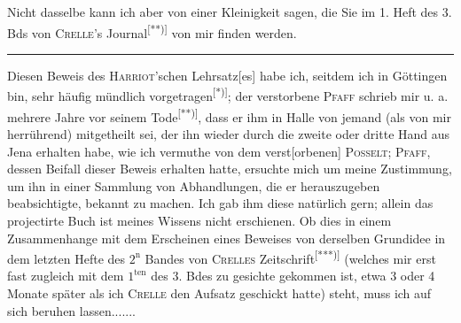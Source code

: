 \par\indent Nicht dasselbe kann ich aber von einer Kleinigkeit sagen, die Sie im 1. Heft des 3. Bds von \textsc{Crelle}’s Journal\textsuperscript{[**)]} von mir finden werden.
\par\vfill\noindent\rule{.25\linewidth}{.4pt}\par\smallskip
\begingroup\footnotesize
{}\par
{}\par\endgroup
\clearpage
{}
\noindent Diesen Beweis des \textsc{Harriot}’schen Lehrsatz[es] habe ich, seitdem ich in Göttingen bin, sehr häufig mündlich vorgetragen\textsuperscript{[*)]}; der verstorbene \textsc{Pfaff} schrieb mir u. a. mehrere Jahre vor seinem Tode\textsuperscript{[**)]}, dass er ihm in Halle von jemand (als von mir herrührend) mitgetheilt sei, der ihn wieder durch die zweite oder dritte Hand aus Jena erhalten habe, wie ich vermuthe von dem verst[orbenen] \textsc{Posselt}; \textsc{Pfaff}, dessen Beifall dieser Beweis erhalten hatte, ersuchte mich um meine Zustimmung, um ihn in einer Sammlung von Abhandlungen, die er herauszugeben beabsichtigte, bekannt zu machen. Ich gab ihm diese natürlich gern; allein das projectirte Buch ist meines Wissens nicht erschienen. Ob dies in einem Zusammenhange mit dem Erscheinen eines Beweises von derselben Grundidee in dem letzten Hefte des $2^{\mathrm{n}}$ Bandes von \textsc{Crelles} Zeitschrift\textsuperscript{[***)]} (welches mir erst fast zugleich mit dem $1^{\mathrm{ten}}$ des 3. Bdes zu gesichte gekommen ist, etwa 3 oder 4 Monate später als ich \textsc{Crelle} den Aufsatz geschickt hatte) steht, muss ich auf sich beruhen lassen.\quad .\enspace .\enspace .\enspace .\enspace .\enspace .

